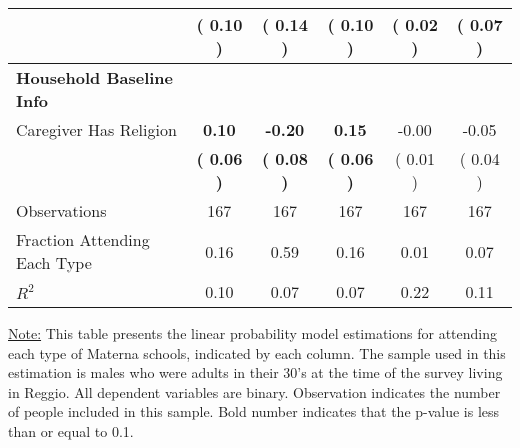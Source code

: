 \begin{table}[H]
{\begin{tabular}{lccccc}
\quad  & (     0.10 ) & (     0.14 )  & (     0.10 )  & (     0.02 ) & (     0.07 ) \\
\midrule
\textbf{Household Baseline Info} \\
\quad Caregiver Has Religion & \textbf{     0.10} & \textbf{    -0.20} & \textbf{     0.15} &     -0.00 &     -0.05 \\
\quad  & \textbf{(     0.06 )} & \textbf{(     0.08 )}  & \textbf{(     0.06 )}  & (     0.01 ) & (     0.04 ) \\
\midrule
Observations & 167 & 167 & 167 & 167 & 167 \\
Fraction Attending Each Type &      0.16 &      0.59 &      0.16 &      0.01 &      0.07 \\
\midrule
$ R^2$ &      0.10 &      0.07 &      0.07 &      0.22 &      0.11 \\
\bottomrule
\end{tabular}}
\end{table}
\begin{footnotesize}
\noindent\underline{Note:} This table presents the linear probability model estimations for attending each type of Materna schools, indicated by each column. The sample used in this estimation is males who were adults in their 30's at the time of the survey living in Reggio. All dependent variables are binary. Observation indicates the number of people included in this sample. Bold number indicates that the p-value is less than or equal to 0.1.
\end{footnotesize}
